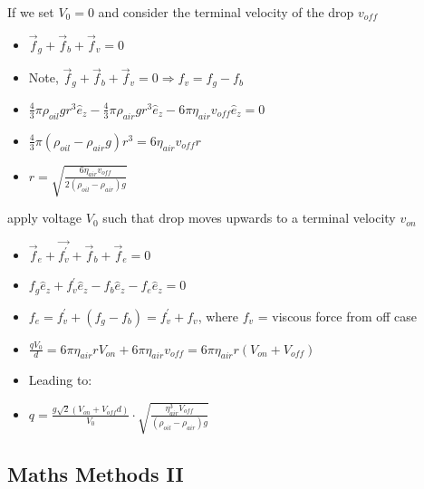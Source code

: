 \documentclass{article}
\begin{document}
If we set $V_0 = 0$ and consider the terminal velocity of the drop $v_{off}$
\begin{itemize}
    \item \(\vec f_g + \vec f_b + \vec f_v = 0\)
    \item Note, \(\vec f_g + \vec f_b + \vec f_v = 0 \Rightarrow f_v=f_g-f_b\)
    \item \(\frac{4}{3}\pi\rho_{oil}gr^3\hat e_z - \frac{4}{3}\pi\rho_{air}gr^3\hat e_z - 6\pi\eta_{air}v_{off}\hat e_z = 0\)
    \item \(\frac{4}{3}\pi(\rho_{oil}-\rho_{air}g)r^3=6\eta_{air}v_{off}r\)
    \item \(\boxed{r=\sqrt{\frac{6\eta_{air} v_{off}}{2(\rho_{oil}-\rho_{air})g}}}\)
\end{itemize}

apply voltage $V_0$ such that drop moves upwards to a terminal velocity \(v_{on}\)
\begin{itemize}
    \item \(\vec f_e + \vec{f_v^\prime} + \vec f_b + \vec f_e = 0\)
    \item \(f_g\hat e_z + f_v^\prime\hat e_z - f_b\hat e_z - f_e\hat e_z = 0\)
    \item \(f_e = f_v^\prime + (f_g - f_b) = f_v^\prime + f_v\), where \(f_v\) = viscous force from off case
    \item \(\frac{qV_0}{d} = 6\pi\eta_{air}rV_{on} + 6\pi\eta_{air}v_{off} = 6\pi\eta_{air}r(V_{on}+V_{off})\)
    \item Leading to: 
    \item \(\boxed{q=\frac{g\sqrt{2}(V_{on}+V_{off}d)}{V_0}\cdot\sqrt{\frac{\eta_{air}^3V_{off}}{(\rho_{oil}-\rho_{air})g}}}\)
\end{itemize}

\subsection{Maths Methods II}
\end{document}

